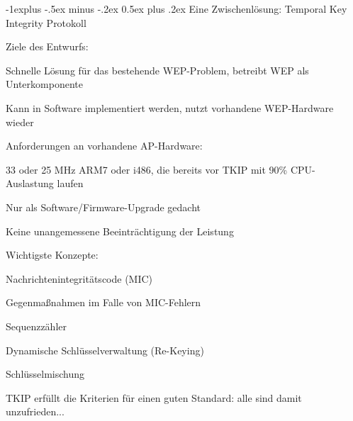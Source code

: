 \documentclass[a4paper]{article}
\makeatletter
\renewcommand{\subsection}{\@startsection{subsection}{2}{0mm}%
 {-1explus -.5ex minus -.2ex}%
 {0.5ex plus .2ex}%
 {\normalfont\normalsize\bfseries}}
\makeatother
\begin{document}
\begin{multicols}{3}
      \subsection{Eine Zwischenlösung: Temporal Key Integrity Protokoll}
      \begin{itemize*}
            \item Ziele des Entwurfs:
            \begin{itemize*}
                  \item Schnelle Lösung für das bestehende WEP-Problem, betreibt WEP als Unterkomponente
                  \item Kann in Software implementiert werden, nutzt vorhandene WEP-Hardware wieder
                  \item Anforderungen an vorhandene AP-Hardware:
                  \begin{itemize*}
                        \item 33 oder 25 MHz ARM7 oder i486, die bereits vor TKIP mit 90\% CPU-Auslastung laufen
                        \item Nur als Software/Firmware-Upgrade gedacht
                        \item Keine unangemessene Beeinträchtigung der Leistung
                  \end{itemize*}
            \end{itemize*}
            \item Wichtigste Konzepte:
            \begin{itemize*}
                  \item Nachrichtenintegritätscode (MIC)
                  \item Gegenmaßnahmen im Falle von MIC-Fehlern
                  \item Sequenzzähler
                  \item Dynamische Schlüsselverwaltung (Re-Keying)
                  \item Schlüsselmischung
            \end{itemize*}
            \item TKIP erfüllt die Kriterien für einen guten Standard: alle sind damit unzufrieden...
      \end{itemize*}


\end{multicols}
\end{document}

